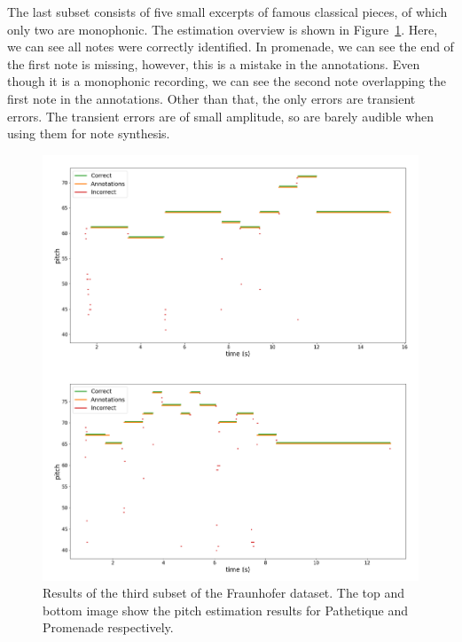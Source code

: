 \documentclass[a4paper,10pt,twocolumn]{article}
\begin{document}
The last subset consists of five small excerpts of famous classical pieces, of which only two are monophonic. The estimation overview is shown in Figure~\ref{fig:dat3}. Here, we can see all notes were correctly identified. In promenade, we can see the end of the first note is missing, however, this is a mistake in the annotations. Even though it is a monophonic recording, we can see the second note overlapping the first note in the annotations. Other than that, the only errors are transient errors. The transient errors are of small amplitude, so are barely audible when using them for note synthesis.
\begin{figure}[!p]
    \centering
    \includegraphics[width=\linewidth]{fig/dataset3.png}
    \caption{Results of the third subset of the Fraunhofer dataset. The top and bottom image show the pitch estimation results for Pathetique and Promenade respectively.}
    \label{fig:dat3}
\end{figure}
\end{document}
